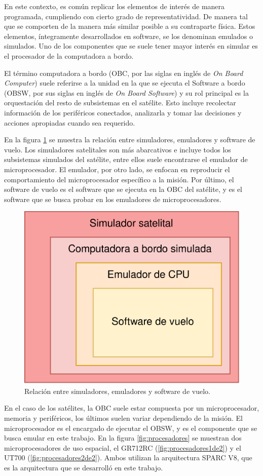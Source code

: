 En este contexto, es común replicar los elementos de interés de manera programada, cumpliendo con cierto grado de representatividad. De manera tal que se comporten de la manera más similar posible a su contraparte física. Estos elementos, íntegramente desarrollados en software, se los denominan emulados o simulados. Uno de los componentes que se suele tener mayor interés en simular es el procesador de la computadora a bordo.

El término computadora a bordo (OBC, por las siglas en inglés de \textit{On Board Computer}) suele referirse a la unidad en la que se ejecuta el Software a bordo (OBSW, por sus siglas en inglés de \textit{On Board Software}) y su rol principal es la orquestación del resto de subsistemas en el satélite. Esto incluye recolectar información de los periféricos conectados, analizarla y tomar las decisiones y acciones apropiadas cuando sea requerido.

En la figura \ref{fig:simu_emu} se muestra la relación entre simuladores, emuladores y software de vuelo. Los simuladores satelitales son más abarcativos e incluye todos los subsistemas simulados del satélite, entre ellos suele encontrarse el emulador de microprocesador. El emulador, por otro lado, se enfocan en reproducir el comportamiento del microprocesador específico a la misión. Por último, el software de vuelo es el software que se ejecuta en la OBC del satélite, y es el software que se busca probar en los emuladores de microprocesadores.

\begin{figure}[htbp]
	\centering
	\includegraphics[width=.6\textwidth]{./Figures/simu_emu}
	\caption{Relación entre simuladores, emuladores y software de vuelo.}
	\label{fig:simu_emu}
\end{figure}

\newpage

En el caso de los satélites, la OBC suele estar compuesta por un microprocesador, memoria y periféricos, los últimos suelen variar dependiendo de la misión. El microprocesador es el encargado de ejecutar el OBSW, y es el componente que se busca emular en este trabajo. En la figura \ref{fig:procesadores} se muestran dos microprocesadores de uso espacial, el GR712RC (\ref{fig:procesadores1de2}) y el UT700 (\ref{fig:procesadores2de2}). Ambos utilizan la arquitectura SPARC V8, que es la arquitectura que se desarrolló en este trabajo.

